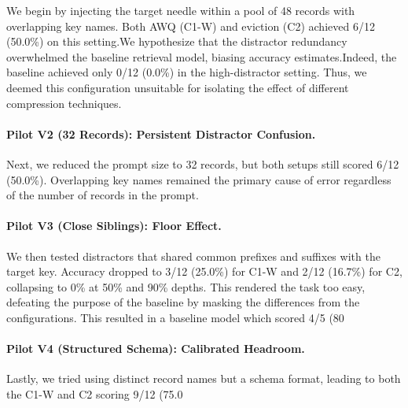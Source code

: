 \documentclass[sigconf,nonacm]{acmart}
\begin{document}
We begin by injecting the target needle within a pool of 48 records with overlapping key names. Both AWQ (C1-W) and eviction (C2) achieved 6/12 (50.0\%) on this setting.We hypothesize that the distractor redundancy overwhelmed the baseline retrieval model, biasing accuracy estimates.Indeed, the baseline achieved only 0/12 (0.0\%) in the high-distractor setting. Thus, we deemed this configuration unsuitable for isolating the effect of different compression techniques.

\paragraph{Pilot V2 (32 Records): Persistent Distractor Confusion.}
Next, we reduced the prompt size to 32 records, but both setups still scored 6/12 (50.0\%). Overlapping key names remained the primary cause of error regardless of the number of records in the prompt.

\paragraph{Pilot V3 (Close Siblings): Floor Effect.}
We then tested distractors that shared common prefixes and suffixes with the target key. Accuracy dropped to 3/12 (25.0\%) for C1-W and 2/12 (16.7\%) for C2, collapsing to 0\% at 50\% and 90\% depths. This rendered the task too easy, defeating the purpose of the baseline by masking the differences from the configurations. This resulted in a baseline model which scored 4/5 (80%

\paragraph{Pilot V4 (Structured Schema): Calibrated Headroom.}
Lastly, we tried using distinct record names but a schema format, leading to both the C1-W and C2 scoring 9/12 (75.0%
\end{document}
